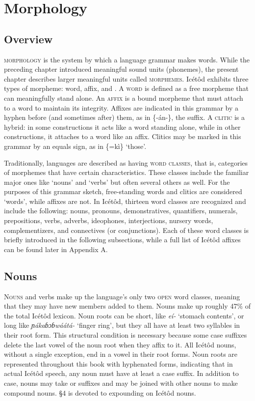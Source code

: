 \section{Morphology}\label{sec:3}
 
\subsection{Overview}\label{sec:3.1}
\largerpage

\textsc{morphology} is the system by which a language grammar makes words. While the preceding chapter introduced meaningful sound units (phonemes), the pres\-ent chapter describes larger meaningful units called \textsc{morphemes}. Icétôd exhibits three types of morpheme: word, affix, and . A \textsc{word} is defined as a free morpheme that can meaningfully stand alone. An \textsc{affix} is a bound morpheme that must attach to a word to maintain its integrity. Affixes are indicated in this grammar by a hyphen before (and sometimes after) them, as in \{-án-\}, the  suffix. A \textsc{clitic} is a hybrid: in some constructions it acts like a word standing alone, while in other constructions, it attaches to a word like an affix. Clitics may be marked in this grammar by an equals sign, as in \{=kì\} ‘those’. 

Traditionally, languages are described as having \textsc{word classes}, that is, categories of morphemes that have certain characteristics. These classes include the familiar major ones like ‘nouns’ and ‘verbs’ but often several others as well. For the purposes of this grammar sketch, free-standing words and clitics are considered ‘words’, while affixes are not. In Icétôd, thirteen word classes are recognized and include the following: nouns, pronouns, demonstratives, quantifiers, numerals, prepositions, verbs, adverbs, ideophones, interjections, nursery words, complementizers, and connectives (or conjunctions). Each of these word classes is briefly introduced in the following subsections, while a full list of Icétôd affixes can be found later in Appendix A.
 
\subsection{Nouns}\label{sec:3.2}


\textsc{Nouns} and verbs make up the language’s only two \textsc{open} word classes, meaning that they may have new members added to them. Nouns make up roughly 47\% of the total Icétôd lexicon. Noun roots can be short, like \textit{eí-} ‘stomach contents’, or long like \textit{ɲákaɓɔɓwáátá-} ‘finger ring’, but they all have at least two syllables in their root form. This structural condition is necessary because some case suffixes delete the last vowel of the noun root when they affix to it. All Icétôd nouns, without a single exception, end in a vowel in their root forms. Noun roots are represented throughout this book with hyphenated forms, indicating that in actual Icétôd speech, any noun must have at least a case suffix. In addition to case, nouns may take  or  suffixes and may be joined with other nouns to make compound nouns. §4 is devoted to expounding on Icétôd nouns.
 
